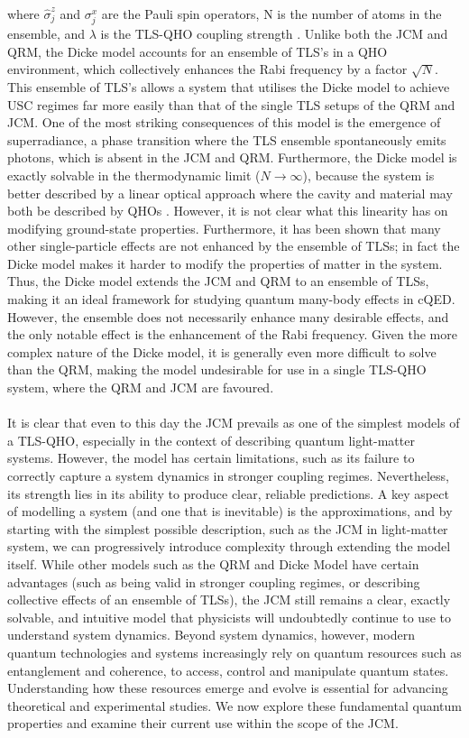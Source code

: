 \documentclass[12pt,a4paper]{article}
\begin{document}
where $\hat{\sigma}_j^z$ and $\sigma_j^x$ are the Pauli spin operators, N is the number of atoms in the ensemble, and $\lambda$ is the TLS-QHO coupling strength \cite{Hamiltonian2019-Dicke}. Unlike both the JCM and QRM, the Dicke model accounts for an ensemble of TLS's in a QHO environment, which collectively enhances the Rabi frequency by a factor $\sqrt{N}$. This ensemble of TLS's allows a system that utilises the Dicke model to achieve USC regimes far more easily than that of the single TLS setups of the QRM and JCM. One of the most striking consequences of this model is the emergence of superradiance, a phase transition where the TLS ensemble spontaneously emits photons, which is absent in the JCM and QRM. Furthermore, the Dicke model is exactly solvable in the thermodynamic limit ($ N \rightarrow \infty$), because the system is better described by a linear optical approach where the cavity and material may both be described by QHOs \cite{General2024-JCM_relevance}. However, it is not clear what this linearity has on modifying ground-state properties. Furthermore, it has been shown that many other single-particle effects are not enhanced by the ensemble of TLSs; in fact the Dicke model makes it harder to modify the properties of matter in the system. Thus, the Dicke model extends the JCM and QRM to an ensemble of TLSs, making it an ideal framework for studying quantum many-body effects in cQED. However, the ensemble does not necessarily enhance many desirable effects, and the only notable effect is the enhancement of the Rabi frequency. Given the more complex nature of the Dicke model, it is generally even more difficult to solve than the QRM, making the model undesirable for use in a single TLS-QHO system, where the QRM and JCM are favoured. \\
\\
It is clear that even to this day the JCM prevails as one of the simplest models of a TLS-QHO, especially in the context of describing quantum light-matter systems. However, the model has certain limitations, such as its failure to correctly capture a system dynamics in stronger coupling regimes. Nevertheless, its strength lies in its ability to produce clear, reliable predictions. A key aspect of modelling a system (and one that is inevitable) is the approximations, and by starting with the simplest possible description, such as the JCM in light-matter system, we can progressively introduce complexity through extending the model itself. While other models such as the QRM and Dicke Model have certain advantages (such as being valid in stronger coupling regimes, or describing collective effects of an ensemble of TLSs), the JCM still remains a clear, exactly solvable, and intuitive model that physicists will undoubtedly continue to use to understand system dynamics. Beyond system dynamics, however, modern quantum technologies and systems increasingly rely on quantum resources such as entanglement and coherence, to access, control and manipulate quantum states. Understanding how these resources emerge and evolve is essential for advancing theoretical and experimental studies. We now explore these fundamental quantum properties and examine their current use within the scope of the JCM.
\end{document}
